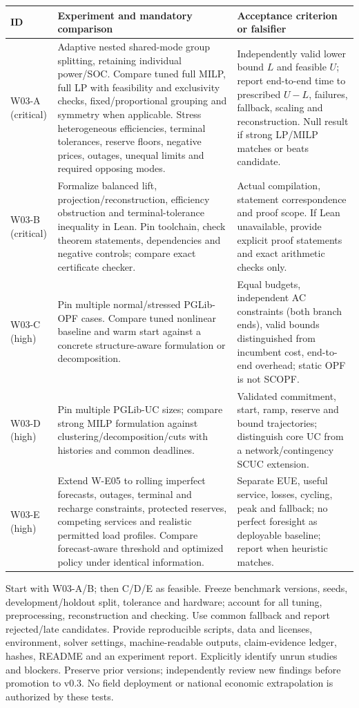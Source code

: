 \documentclass[11pt,letterpaper]{article}
\begin{document}
\begin{longtable}{P{.16\linewidth}P{.39\linewidth}P{.35\linewidth}}
\toprule ID & Experiment and mandatory comparison & Acceptance criterion or falsifier\\\midrule\endhead
W03-A (critical) & Adaptive nested shared-mode group splitting, retaining individual power/SOC. Compare tuned full MILP, full LP with feasibility and exclusivity checks, fixed/proportional grouping and symmetry when applicable. Stress heterogeneous efficiencies, terminal tolerances, reserve floors, negative prices, outages, unequal limits and required opposing modes. & Independently valid lower bound $L$ and feasible $U$; report end-to-end time to prescribed $U-L$, failures, fallback, scaling and reconstruction. Null result if strong LP/MILP matches or beats candidate.\\
W03-B (critical) & Formalize balanced lift, projection/reconstruction, efficiency obstruction and terminal-tolerance inequality in Lean. Pin toolchain, check theorem statements, dependencies and negative controls; compare exact certificate checker. & Actual compilation, statement correspondence and proof scope. If Lean unavailable, provide explicit proof statements and exact arithmetic checks only.\\
W03-C (high) & Pin multiple normal/stressed PGLib-OPF cases. Compare tuned nonlinear baseline and warm start against a concrete structure-aware formulation or decomposition. & Equal budgets, independent AC constraints (both branch ends), valid bounds distinguished from incumbent cost, end-to-end overhead; static OPF is not SCOPF.\\
W03-D (high) & Pin multiple PGLib-UC sizes; compare strong MILP formulation against clustering/decomposition/cuts with histories and common deadlines. & Validated commitment, start, ramp, reserve and bound trajectories; distinguish core UC from a network/contingency SCUC extension.\\
W03-E (high) & Extend W-E05 to rolling imperfect forecasts, outages, terminal and recharge constraints, protected reserves, competing services and realistic permitted load profiles. Compare forecast-aware threshold and optimized policy under identical information. & Separate EUE, useful service, losses, cycling, peak and fallback; no perfect foresight as deployable baseline; report when heuristic matches.\\
\bottomrule
\end{longtable}

Start with W03-A/B; then C/D/E as feasible. Freeze benchmark versions, seeds, development/holdout split, tolerance and hardware; account for all tuning, preprocessing, reconstruction and checking. Use common fallback and report rejected/late candidates. Provide reproducible scripts, data and licenses, environment, solver settings, machine-readable outputs, claim-evidence ledger, hashes, README and an experiment report. Explicitly identify unrun studies and blockers. Preserve prior versions; independently review new findings before promotion to v0.3. No field deployment or national economic extrapolation is authorized by these tests.
\end{document}
